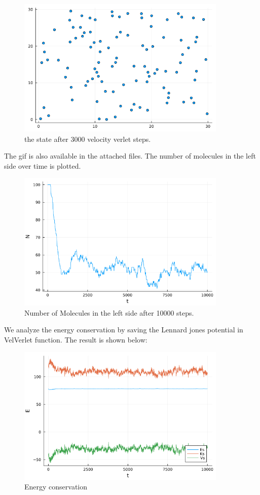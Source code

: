 \documentclass[12pt,a4paper]{article}
\begin{document}
	\begin{figure}[H]
		\centering
		\includegraphics[width=10cm]{boxafter3000.png}
		\caption{the state after 3000 velocity verlet steps. }
	\end{figure}
	The gif is also available in the attached files.
	The number of molecules in the left side over time is plotted.
	\begin{figure}[H]
		\centering
		\includegraphics[width=10cm]{n.png}

		\caption{Number of Molecules in the left side after 10000 steps. }
	\end{figure}
		We analyze the energy conservation by saving the Lennard jones potential in VelVerlet function. The result is shown below:
		\begin{figure}[H]
			\centering
			\includegraphics[width=10cm]{E.png}
			\caption{Energy conservation}
		\end{figure}
\end{document}
